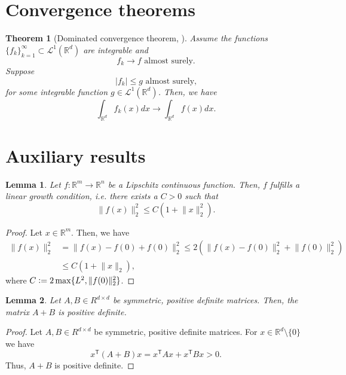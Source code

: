\documentclass[12pt]{article}
\newtheorem{theorem}{Theorem}[section]
\newtheorem{lemma}[lemma]{Lemma}
\theoremstyle{definition}
\numberwithin{equation}{section}
\newcommand{\R}{\mathbb{R}}
\newcommand{\CL}{\mathcal{L}}
\newcommand{\T}{\mathsf{T}}
\newcommand{\norm}[1]{\lVert{#1}\rVert_2}
\newcommand{\defeq}{\vcentcolon=}
\begin{document}
\section{Convergence theorems}
\begin{theorem}[Dominated convergence theorem, ]
  \label{thm:dominated_convergence}
  Assume the functions $\{f_k\}_{k=1}^{\infty} \subset \CL^1(\R^d)$ are integrable and
  \begin{equation*}
    f_k \rightarrow f \text{ almost surely.}
  \end{equation*}
  Suppose
  \begin{equation*}
    |f_k| \leq g \text{ almost surely,}
  \end{equation*}
  for some integrable function $g \in \CL^1(\R^d)$. Then, we have
  \begin{equation*}
    \int_{\R^d} f_k(x) dx \rightarrow \int_{\R^d} f(x) dx.
  \end{equation*}
\end{theorem}
\section{Auxiliary results}
\begin{lemma}
  \label{lemma:linear_growth}
  Let $f : \R^m \rightarrow \R^n$ be a Lipschitz continuous function. Then, $f$ fulfills a linear growth condition, i.e. there exists a $C > 0$ such that 
  \begin{equation*}
    \norm{f(x)}^2 \leq C (1 + \norm{x}^2).
  \end{equation*}
\end{lemma}
\begin{proof}
  Let $x \in \R^m$. Then, we have
  \begin{align*}
    \norm{f(x)}^2 &= \norm{f(x) - f(0) + f(0)}^2 \leq 2 \left( \norm{f(x) - f(0)}^2 + \norm{f(0)}^2\right) \\
    &\leq C(1+\norm{x}),
  \end{align*}
  where $C \defeq 2\max\{L^2, \norm{f(0)}^2\}$.
\end{proof}
\begin{lemma}
  \label{lem:sum_positive_definite}
  Let $A,B \in R^{d \times d}$ be symmetric, positive definite matrices. Then, the matrix $A+B$ is positive definite.
\end{lemma}
\begin{proof}
  Let $A,B \in R^{d \times d}$ be symmetric, positive definite matrices. For $x \in \R^d \setminus \{0\}$ we have
  \begin{equation*}
    x^\T(A+B)x = x^\T A x + x^\T B x > 0.
  \end{equation*}
  Thus, $A+B$ is positive definite.
\end{proof}
\end{document}
